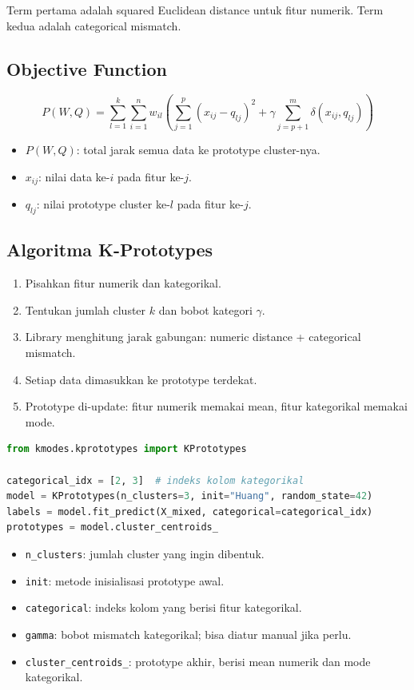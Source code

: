 \documentclass{article}
\newcommand{\code}[1]{\texttt{#1}}
\begin{document}
Term pertama adalah squared Euclidean distance untuk fitur numerik. Term kedua adalah categorical mismatch.

\subsection{Objective Function}

\begin{equation}
P(W,Q)=\sum_{l=1}^{k}\sum_{i=1}^{n}w_{il}
\left(
\sum_{j=1}^{p}(x_{ij}-q_{lj})^2+
\gamma\sum_{j=p+1}^{m}\delta(x_{ij},q_{lj})
\right)
\end{equation}
\begin{itemize}[leftmargin=*]
    \item $P(W,Q)$: total jarak semua data ke prototype cluster-nya.
    \item $x_{ij}$: nilai data ke-$i$ pada fitur ke-$j$.
    \item $q_{lj}$: nilai prototype cluster ke-$l$ pada fitur ke-$j$.
\end{itemize}

\subsection{Algoritma K-Prototypes}
\begin{enumerate}[leftmargin=*]
    \item Pisahkan fitur numerik dan kategorikal.
    \item Tentukan jumlah cluster $k$ dan bobot kategori $\gamma$.
    \item Library menghitung jarak gabungan: numeric distance + categorical mismatch.
    \item Setiap data dimasukkan ke prototype terdekat.
    \item Prototype di-update: fitur numerik memakai mean, fitur kategorikal memakai mode.
\end{enumerate}
\begin{lstlisting}[language=Python]
from kmodes.kprototypes import KPrototypes

categorical_idx = [2, 3]  # indeks kolom kategorikal
model = KPrototypes(n_clusters=3, init="Huang", random_state=42)
labels = model.fit_predict(X_mixed, categorical=categorical_idx)
prototypes = model.cluster_centroids_
\end{lstlisting}
\begin{itemize}[leftmargin=*]
    \item \code{n\_clusters}: jumlah cluster yang ingin dibentuk.
    \item \code{init}: metode inisialisasi prototype awal.
    \item \code{categorical}: indeks kolom yang berisi fitur kategorikal.
    \item \code{gamma}: bobot mismatch kategorikal; bisa diatur manual jika perlu.
    \item \code{cluster\_centroids\_}: prototype akhir, berisi mean numerik dan mode kategorikal.
\end{itemize}
\end{document}
